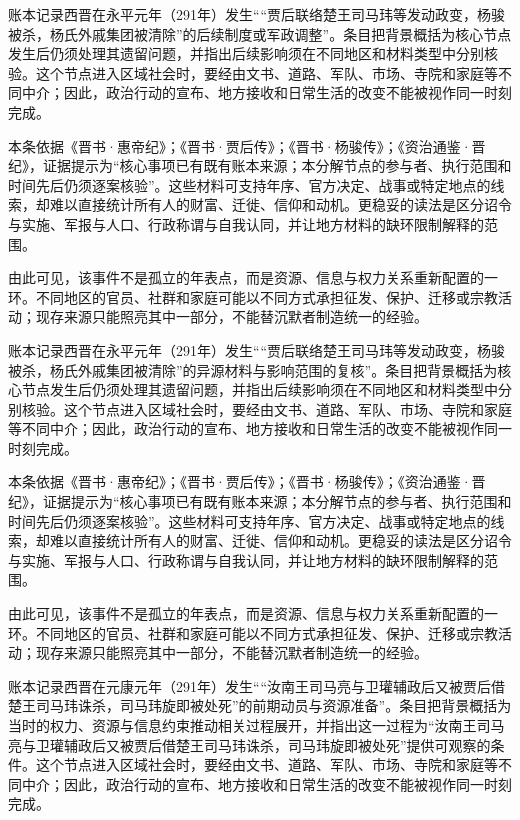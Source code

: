 账本记录西晋在永平元年（291年）发生““贾后联络楚王司马玮等发动政变，杨骏被杀，杨氏外戚集团被清除”的后续制度或军政调整”。条目把背景概括为核心节点发生后仍须处理其遗留问题，并指出后续影响须在不同地区和材料类型中分别核验。这个节点进入区域社会时，要经由文书、道路、军队、市场、寺院和家庭等不同中介；因此，政治行动的宣布、地方接收和日常生活的改变不能被视作同一时刻完成。

本条依据《晋书·惠帝纪》；《晋书·贾后传》；《晋书·杨骏传》；《资治通鉴·晋纪》，证据提示为“核心事项已有既有账本来源；本分解节点的参与者、执行范围和时间先后仍须逐案核验”。这些材料可支持年序、官方决定、战事或特定地点的线索，却难以直接统计所有人的财富、迁徙、信仰和动机。更稳妥的读法是区分诏令与实施、军报与人口、行政称谓与自我认同，并让地方材料的缺环限制解释的范围。

由此可见，该事件不是孤立的年表点，而是资源、信息与权力关系重新配置的一环。不同地区的官员、社群和家庭可能以不同方式承担征发、保护、迁移或宗教活动；现存来源只能照亮其中一部分，不能替沉默者制造统一的经验。

账本记录西晋在永平元年（291年）发生““贾后联络楚王司马玮等发动政变，杨骏被杀，杨氏外戚集团被清除”的异源材料与影响范围的复核”。条目把背景概括为核心节点发生后仍须处理其遗留问题，并指出后续影响须在不同地区和材料类型中分别核验。这个节点进入区域社会时，要经由文书、道路、军队、市场、寺院和家庭等不同中介；因此，政治行动的宣布、地方接收和日常生活的改变不能被视作同一时刻完成。

本条依据《晋书·惠帝纪》；《晋书·贾后传》；《晋书·杨骏传》；《资治通鉴·晋纪》，证据提示为“核心事项已有既有账本来源；本分解节点的参与者、执行范围和时间先后仍须逐案核验”。这些材料可支持年序、官方决定、战事或特定地点的线索，却难以直接统计所有人的财富、迁徙、信仰和动机。更稳妥的读法是区分诏令与实施、军报与人口、行政称谓与自我认同，并让地方材料的缺环限制解释的范围。

由此可见，该事件不是孤立的年表点，而是资源、信息与权力关系重新配置的一环。不同地区的官员、社群和家庭可能以不同方式承担征发、保护、迁移或宗教活动；现存来源只能照亮其中一部分，不能替沉默者制造统一的经验。

账本记录西晋在元康元年（291年）发生““汝南王司马亮与卫瓘辅政后又被贾后借楚王司马玮诛杀，司马玮旋即被处死”的前期动员与资源准备”。条目把背景概括为当时的权力、资源与信息约束推动相关过程展开，并指出这一过程为“汝南王司马亮与卫瓘辅政后又被贾后借楚王司马玮诛杀，司马玮旋即被处死”提供可观察的条件。这个节点进入区域社会时，要经由文书、道路、军队、市场、寺院和家庭等不同中介；因此，政治行动的宣布、地方接收和日常生活的改变不能被视作同一时刻完成。

